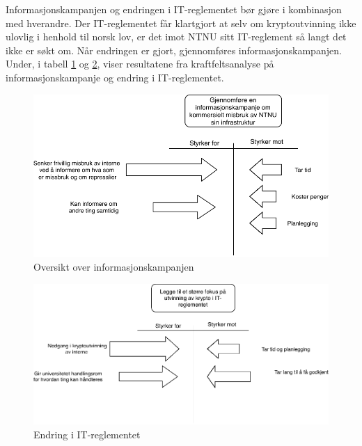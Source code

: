  Informasjonskampanjen og endringen i IT-reglementet bør gjøre i kombinasjon med hverandre. Der IT-reglementet får klartgjort at selv om kryptoutvinning ikke ulovlig i henhold til norsk lov, er det imot NTNU sitt IT-reglement så langt det ikke er søkt om. Når endringen er gjort, gjennomføres informasjonskampanjen.   
 Under, i tabell \ref{fig:kampanje} og \ref{fig:IT-reglement}, viser resultatene fra kraftfeltsanalyse på informasjonskampanje og endring i IT-reglementet.
 \begin{figure}[H]
    \hspace{2.2cm}
    \includegraphics[scale=0.6]{case_3/bilder/Force-field1.pdf}
    \caption[Informasjonskampanje]{Oversikt over informasjonskampanjen }
    \label{fig:kampanje}
\end{figure}

 \begin{figure}[H]
    \hspace{2.6cm}
    \includegraphics[scale=0.6]{case_3/bilder/Force-field2.pdf}
    \caption[Endre IT-reglementet]{Endring i IT-reglementet}
    \label{fig:IT-reglement}
\end{figure}

